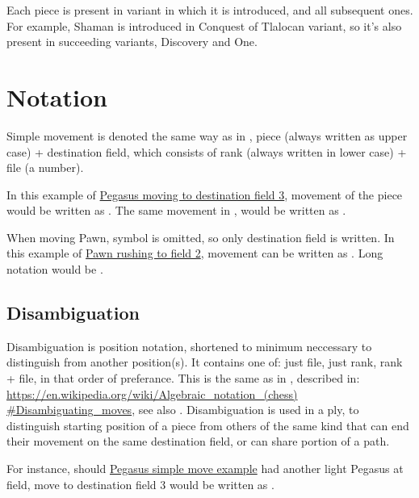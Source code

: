 Each piece is present in variant in which it is introduced, and all subsequent ones.
For example, Shaman is introduced in Conquest of Tlalocan variant, so it's also present
in succeeding variants, Discovery and One.

\clearpage %

\section*{Notation}
\label{sec:Appendix/Notation}

Simple movement is denoted the same way as in , piece (always written as upper
case) + destination field, which consists of rank (always written in lower case) + file
(a number).

In this example of \hyperref[fig:scn_ct_03_define_step_ply]{Pegasus moving to destination
field 3}, movement of the piece would be written as . The same movement in
, would be written as .

When moving Pawn, symbol is omitted, so only destination field is written. In this example
of \hyperref[fig:04_croatian_ties_en_passant]{Pawn rushing to field 2}, movement can be
written as . Long notation would be .

\subsection*{Disambiguation}
\label{sec:Appendix/Notation/Disambiguation}

Disambiguation is position notation, shortened to minimum neccessary to distinguish from
another position(s). It contains one of: just file, just rank, rank + file, in that order
of preferance. This is the same as in , described in: \\
\href{https://en.wikipedia.org/wiki/Algebraic\_notation\_(chess)\#Disambiguating\_moves}{https://en.wikipedia.org/wiki/Algebraic\_notation\_(chess)\\
\#Disambiguating\_moves}, see also .
Disambiguation is used in a ply, to distinguish starting position of a piece from others
of the same kind that can end their movement on the same destination field, or can share
portion of a path.

For instance, should \hyperref[fig:scn_ct_03_define_step_ply]{Pegasus simple move example}
had another light Pegasus at  field, move to destination field 3 would be written
as .

